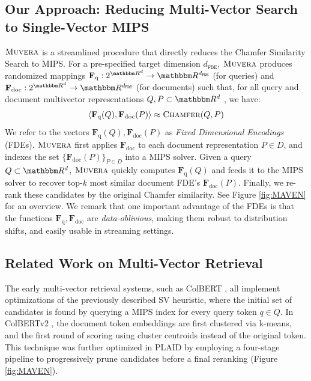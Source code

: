 \documentclass{article}
\newcommand{\name}{\textsc{Muvera}}
\newcommand{\CH}{\textsc{Chamfer}}
\newcommand{\dfde}{d_{\texttt{FDE}}}
\newcommand{\fdeq}{\mathbf{F}_{\text{q}}}
\newcommand{\fded}{\mathbf{F}_{\text{doc}}}
\begin{document}
\subsection{Our Approach: Reducing Multi-Vector Search to Single-Vector MIPS}
 $\name$ is a streamlined procedure that directly reduces the Chamfer Similarity Search to MIPS. For a pre-specified target dimension $\dfde$, $\name$ produces randomized mappings $\fdeq:2^{\R^d}\to \R^{\dfde}$ (for queries) and $\fded:2^{\R^d}\to \R^{\dfde}$ (for documents) such that, for all query and document  multivector representations $Q,P \subset \R^d$ , we have:
\[\langle \fdeq(Q) , \fded(P) \rangle \approx \CH(Q,P) \]
We refer to the vectors $\fdeq(Q) , \fded(P) $ as \emph{Fixed Dimensional Encodings} (FDEs). $\name$ first applies $\fded$ to each document representation $P \in D$, and indexes the set $\{\fded(P)\}_{P \in D}$ into a MIPS solver. Given a query $Q \subset \R^d$, $\name$ quickly computes $\fdeq(Q)$ and feeds it to the MIPS solver to recover top-$k$ most similar document FDE's $\fded(P)$. Finally, we re-rank these candidates by the original Chamfer similarity. See Figure \ref{fig:MAVEN} for an overview. We remark that one important advantage of the FDEs is that the functions $ \fdeq, \fded$ are \emph{data-oblivious}, making them robust to distribution shifts, and easily usable in streaming settings.  


\subsection{Related Work on Multi-Vector Retrieval}

The early multi-vector retrieval systems, such as ColBERT \cite{khattab2020colbert}, all implement optimizations of the previously described SV heuristic, where the initial set of candidates is found by querying a MIPS index for every query token $q \in Q$. 
In ColBERTv2 \cite{santhanam2021colbertv2}, the document token embeddings are first clustered via k-means, and the first round of scoring using cluster centroids instead of the original token. 
This technique was further optimized in PLAID \cite{santhanam2022plaid} by employing a four-stage pipeline to progressively prune candidates before a final reranking (Figure \ref{fig:MAVEN}).
\end{document}
